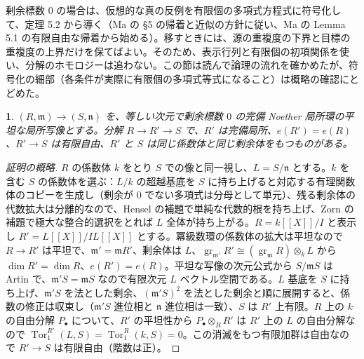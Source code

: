 \documentclass[11pt,a4paper]{ltjsarticle}
\newcommand{\stmtname}{}
\theoremstyle{plain}
\newtheorem*{stmtgen}{\stmtname}
\newenvironment{stmt}[1]{\renewcommand{\stmtname}{#1}\begin{stmtgen}}{\end{stmtgen}}
\theoremstyle{definition}
\newcommand{\m}{\mathfrak{m}}
\newcommand{\n}{\mathfrak{n}}
\newcommand{\Tor}{\operatorname{Tor}}
\newcommand{\gr}{\operatorname{gr}}
\begin{document}
剰余標数 $0$ の場合は、仮想的な真の反例を有限個の多項式方程式に符号化して、定理 5.2 から導く（Ma の \S5 の帰着と近似の方針に従い、Ma の Lemma 5.1 の有限自由な帰着から始める）。移すときには、源の重複度の下界と目標の重複度の上界だけを保てばよい。そのため、表示行列と有限個の初項関係を使い、分解のホモロジーは追わない。この節は読んで論理の流れを確かめたが、符号化の細部（各条件が実際に有限個の多項式等式になること）は概略の確認にとどめた。

\begin{stmt}{補題 7.1}
$(R,\m)\to(S,\n)$ を、等しい次元で剰余標数 $0$ の完備 Noether 局所環の平坦な局所写像とする。分解 $R\to R'\to S$ で、$R'$ は完備局所、$e(R') = e(R)$、$R'\to S$ は有限自由、$R'$ と $S$ は同じ係数体と同じ剰余体をもつものがある。
\end{stmt}
\begin{proof}[証明の概略]
$R$ の係数体 $k$ をとり $S$ での像と同一視し、$L = S/\n$ とする。$k$ を含む $S$ の係数体を選ぶ：$L/k$ の超越基底を $S$ に持ち上げると対応する有理関数体のコピーを生成し（剰余が $0$ でない多項式は分母として単元）、残る剰余体の代数拡大は分離的なので、Hensel の補題で単純な代数的根を持ち上げ、Zorn の補題で極大な整合的選択をとれば $L$ 全体が持ち上がる。$R = k[[X]]/I$ と表示し $R' = L[[X]]/IL[[X]]$ とする。冪級数環の係数体の拡大は平坦なので $R\to R'$ は平坦で、$\m' = \m R'$、剰余体は $L$、$\gr_{\m'}R'\cong(\gr_\m R)\otimes_kL$ から $\dim R' = \dim R$、$e(R') = e(R)$。平坦な写像の次元公式から $S/\m S$ は Artin で、$\m'S = \m S$ なので有限次元 $L$ ベクトル空間である。$L$ 基底を $S$ に持ち上げ、$\m'S$ を法とした剰余、$(\m'S)^2$ を法とした剰余と順に展開すると、係数の修正は収束し（$\m'S$ 進位相と $\n$ 進位相は一致）、$S$ は $R'$ 上有限。$R$ 上の $k$ の自由分解 $P_\bullet$ について、$R'$ の平坦性から $P_\bullet\otimes_RR'$ は $R'$ 上の $L$ の自由分解なので $\Tor_1^{R'}(L,S) = \Tor_1^R(k,S) = 0$。この消滅をもつ有限加群は自由なので $R'\to S$ は有限自由（階数は正）。
\end{proof}
\end{document}
